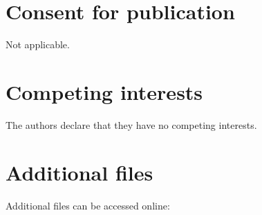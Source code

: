 \section*{Consent for publication}
Not applicable.

\section*{Competing interests}
The authors declare that they have no competing interests.

\section*{Additional files}\label{Additional files}
Additional files can be accessed online: \\



